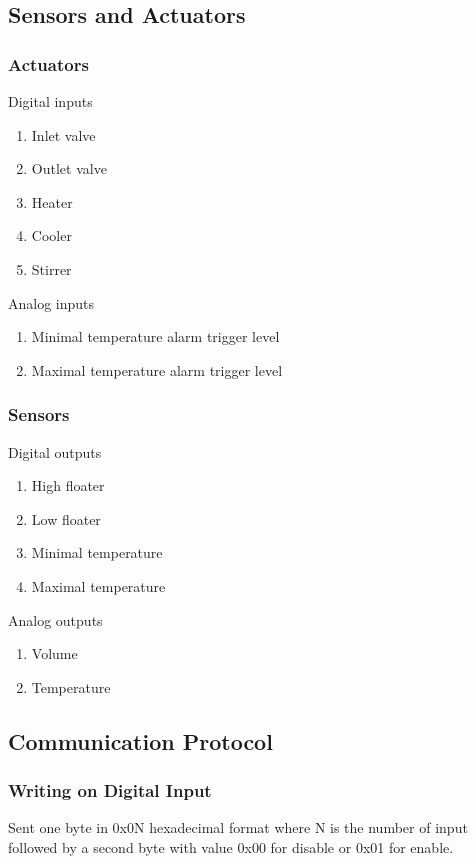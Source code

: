 \subsection{Sensors and Actuators}


\subsubsection{Actuators}

Digital inputs
\begin{enumerate}
\item Inlet valve
\item Outlet valve
\item Heater
\item Cooler
\item Stirrer
\end{enumerate}



Analog inputs
\begin{enumerate}
\item Minimal temperature alarm trigger level
\item Maximal temperature alarm trigger level
\end{enumerate}

\subsubsection{Sensors}

Digital outputs
\begin{enumerate}
\item High floater 
\item Low floater
\item Minimal temperature 
\item Maximal temperature
\end{enumerate}


Analog outputs
\begin{enumerate}
\item Volume
\item Temperature
\end{enumerate}




\subsection{Communication Protocol}


\subsubsection{Writing on Digital Input}
Sent one byte in 0x0N hexadecimal format where N  is the number of input followed by a second byte with value 0x00 for disable or 0x01 for enable.  

